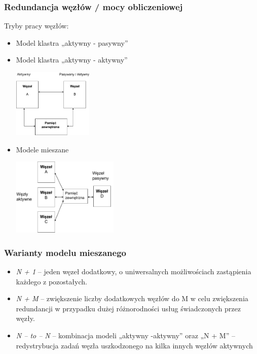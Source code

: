 		\subsubsection{Redundancja węzłów / mocy obliczeniowej}
			Tryby pracy węzłów:
			\begin{itemize}
				\item Model klastra „aktywny - pasywny”
				\item Model klastra „aktywny - aktywny”
				\begin{center}
					\includegraphics[width=0.3\textwidth]{./images/klastry02}
				\end{center}
				\item Modele mieszane
				\begin{center}
					\includegraphics[width=0.4\textwidth]{./images/klastry03}
				\end{center}
			\end{itemize}
		\subsubsection{Warianty modelu mieszanego}
			\begin{itemize}
				\item \emph{N + 1} – jeden węzeł dodatkowy, o uniwersalnych możliwościach zastąpienia każdego z pozostałych.
				\item \emph{N + M} – zwiększenie liczby dodatkowych węzłów do M w celu zwiększenia redundancji w przypadku dużej różnorodności usług świadczonych przez węzły.
				\item \emph{N – to – N} – kombinacja modeli „aktywny -aktywny” oraz „N + M” –redystrybucja zadań węzła uszkodzonego na kilka innych węzłów aktywnych
			\end{itemize}
